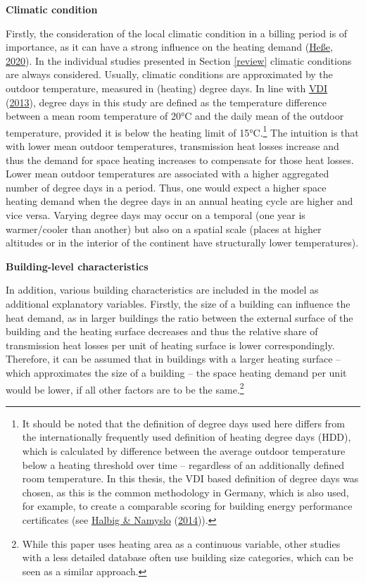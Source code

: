 \documentclass[12pt,twoside]{reedthesis}
\begin{document}
\textbf{Climatic condition}

Firstly, the consideration of the local climatic condition in a billing period is of importance, as it can have a strong influence on the heating demand (\protect\hyperlink{ref-hesse20}{Heße, 2020}). In the individual studies presented in Section \ref{review} climatic conditions are always considered. Usually, climatic conditions are approximated by the outdoor temperature, measured in (heating) degree days. In line with \protect\hyperlink{ref-vdi13}{VDI} (\protect\hyperlink{ref-vdi13}{2013}), degree days in this study are defined as the temperature difference between a mean room temperature of 20°C and the daily mean of the outdoor temperature, provided it is below the heating limit of 15°C.\footnote{It should be noted that the definition of degree days used here differs from the internationally frequently used definition of heating degree days (HDD), which is calculated by difference between the average outdoor temperature below a heating threshold over time -- regardless of an additionally defined room temperature. In this thesis, the VDI based definition of degree days was chosen, as this is the common methodology in Germany, which is also used, for example, to create a comparable scoring for building energy performance certificates (see \protect\hyperlink{ref-halbig_namyslo14}{Halbig \& Namyslo} (\protect\hyperlink{ref-halbig_namyslo14}{2014})).} The intuition is that with lower mean outdoor temperatures, transmission heat losses increase and thus the demand for space heating increases to compensate for those heat losses. Lower mean outdoor temperatures are associated with a higher aggregated number of degree days in a period. Thus, one would expect a higher space heating demand when the degree days in an annual heating cycle are higher and vice versa. Varying degree days may occur on a temporal (one year is warmer/cooler than another) but also on a spatial scale (places at higher altitudes or in the interior of the continent have structurally lower temperatures).

\textbf{Building-level characteristics}

In addition, various building characteristics are included in the model as additional explanatory variables. Firstly, the size of a building can influence the heat demand, as in larger buildings the ratio between the external surface of the building and the heating surface decreases and thus the relative share of transmission heat losses per unit of heating surface is lower correspondingly. Therefore, it can be assumed that in buildings with a larger heating surface -- which approximates the size of a building -- the space heating demand per unit would be lower, if all other factors are to be the same.\footnote{While this paper uses heating area as a continuous variable, other studies with a less detailed database often use building size categories, which can be seen as a similar approach.}
\end{document}
